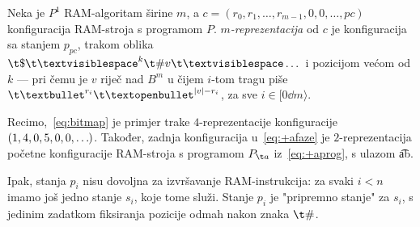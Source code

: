 \begin{definicija}[{name=[$m$-reprezentacija RAM-konfiguracije]}]
	Neka je $P^1$ RAM-algoritam širine $m$, a $c=(r_0,r_1,\dots,r_{m-1},0,0,\dots,pc)$ konfiguracija RAM-stroja s programom $P$. \emph{$m$-reprezentacija} od $c$ je konfiguracija sa stanjem $p_{pc}$, trakom oblika $\t\$\bl^k\t\#v\bl\dots$ i pozicijom većom od $k$ --- pri čemu je $v$ riječ nad $B^m$ u čijem $i$-tom tragu piše $\t\textbullet^{r_i}\t\textopenbullet^{\dulj v-r_i}$, za sve $i\in[0\dd m\rangle$.
\end{definicija}

Recimo,~\eqref{eq:bitmap} je primjer trake $4$-reprezentacije konfiguracije $(1,4,0,5,0,0,\dots\mspace{-1mu})$. Također, zadnja konfiguracija u~\eqref{eq:+afaze} je $2$-reprezentacija početne konfiguracije RAM-stroja s programom $P_{\t a}$ iz~\eqref{eq:+aprog}, s ulazom \t{ab}.

Ipak, stanja $p_i$ nisu dovoljna za izvršavanje RAM-instrukcija: za svaki $i<n$ imamo još jedno stanje $s_i$, koje tome služi. Stanje $p_i$ je "pripremno stanje" za $s_i$, s jedinim zadatkom fiksiranja pozicije odmah nakon znaka $\t\#$.


